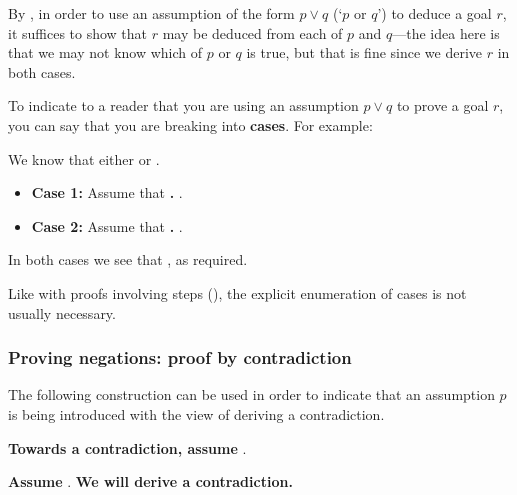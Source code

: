 By , in order to use an assumption of the form $p \vee q$ (`$p$ or $q$') to deduce a goal $r$, it suffices to show that $r$ may be deduced from each of $p$ and $q$---the idea here is that we may not know which of $p$ or $q$ is true, but that is fine since we derive $r$ in both cases.

\begin{vocabulary}
\label{vcbCases}
To indicate to a reader that you are using an assumption $p \vee q$ to prove a goal $r$, you can say that you are breaking into \textbf{cases}. For example:

\begin{vocabtemplate}
We know that either  or .
\begin{itemize}
\item \textbf{Case 1:} Assume that \textbf{.} .
\item \textbf{Case 2:} Assume that \textbf{.} .
\end{itemize}
In both cases we see that , as required.
\end{vocabtemplate}

Like with proofs involving steps (), the explicit enumeration of cases is not usually necessary.
\end{vocabulary}

\subsubsection*{Proving negations: proof by contradiction}

\todo{}

\begin{vocabulary}
The following construction can be used in order to indicate that an assumption $p$ is being introduced with the view of deriving a contradiction.

\begin{vocabtemplate}
\textbf{Towards a contradiction, assume} .

\vtor

\textbf{Assume} . \textbf{We will derive a contradiction.}
\end{vocabtemplate}
\end{vocabulary}

\todo{}

